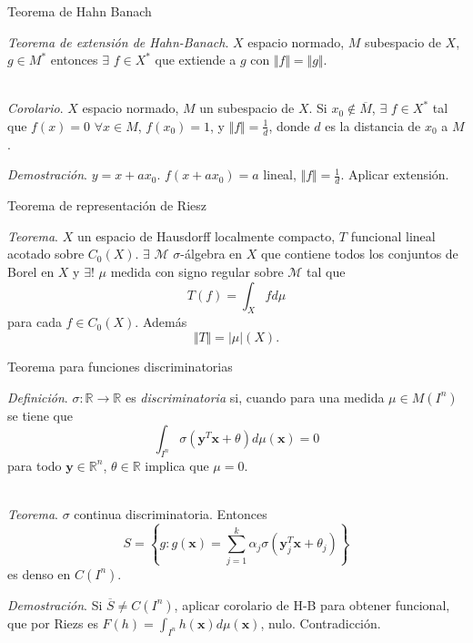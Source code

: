 \documentclass[spanish]{beamer}
\begin{document}
\begin{frame}{Teorema de Hahn Banach}

\textit{Teorema de extensión de Hahn-Banach}. $X$ espacio normado, $M$ subespacio de $X$, $g \in M^*$ entonces $\exists$ $f \in X^*$ que extiende a $g$ con $\Vert f \Vert = \Vert g \Vert$.
\\~\

\pause

\textit{Corolario}. $X$ espacio normado, $M$ un subespacio de $X$. Si $x_0 \notin \overline{M}$, $\exists$ $f \in X^*$ tal que $f(x) = 0$ $\forall x \in M$, $f(x_0) = 1$, y $\Vert f \Vert = \frac{1}{d}$, donde $d$ es la distancia de $x_0$ a $M$.

\pause

\textit{Demostración}. $y = x + ax_0$. $f(x+ax_0) = a$ lineal, $\Vert f \Vert = \frac{1}{d}$. Aplicar extensión.
\end{frame}

\begin{frame}{Teorema de representación de Riesz}

\textit{Teorema}. $X$ un espacio de Hausdorff localmente compacto, $T$ funcional lineal acotado sobre $C_0(X)$. $\exists$ $\mathcal{M}$ $\sigma$-álgebra en $X$ que contiene todos los conjuntos de Borel en $X$ y $\exists !$ $\mu$ medida con signo regular sobre $\mathcal{M}$ tal que $$ T(f) = \int_X fd\mu$$ para cada $f \in C_0(X)$. Además $$\Vert T \Vert = \vert \mu \vert (X).$$
\end{frame}

\begin{frame}{Teorema para funciones discriminatorias}

\textit{Definición}. $\sigma: \mathbb{R} \rightarrow \mathbb{R}$ es \textit{discriminatoria} si, cuando para una medida $\mu \in M(I^n)$ se tiene que $$\int_{I^n} \sigma(\textbf{y}^T \textbf{x} + \theta)d\mu(\textbf{x})= 0$$
para todo $\textbf{y} \in \mathbb{R}^n$, $\theta \in \mathbb{R}$ implica que $\mu = 0$.
\\~\

\pause

\textit{Teorema}. $\sigma$ continua discriminatoria. Entonces
$$S = \left\{ g: g(\textbf{x}) = \sum_{j=1}^k \alpha_j \sigma(\textbf{y}_j^T \textbf{x} + \theta_j) \right\}$$
es denso en $C(I^n)$.
\pause

\textit{Demostración}. Si $\overline{S} \neq C(I^n)$, aplicar corolario de H-B para obtener funcional, que por Riezs es $F(h) = \int_{I^n}h(\textbf{x})d\mu(\textbf{x})$, nulo. Contradicción.

\end{frame}
\end{document}
